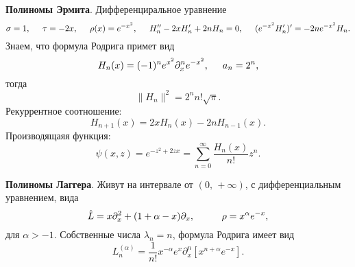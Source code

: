 \textbf{Полиномы Эрмита}. Дифференциральное уравнение
\begin{equation*}
    \sigma = 1, \hspace{5 mm} 
    \tau = - 2 x,
    \hspace{5 mm} \rho(x)  = e^{-x^2},
    \hspace{5 mm} 
    H_n'' - 2 x H_n' + 2 n H_n = 0, 
    \hspace{5 mm} 
    (e^{-x^2} H_n')' = -2 n e^{-x^2} H_n.
\end{equation*}
Знаем, что формула Родрига примет вид
\begin{equation*}
    H_n (x) = (-1)^n e^{x^2} \partial_x^n e^{-x^2},
    \hspace{5 mm} 
    a_n = 2^n,
\end{equation*}
тогда
\begin{equation*}
    \|H_n\|^2 =  2^n n! \sqrt{\pi}.
\end{equation*}
Рекуррентное соотношение:
\begin{equation*}
    H_{n+1} (x) = 2 x H_n (x) - 2 n H_{n-1} (x).
\end{equation*}
Производящаяя функция:
\begin{equation*}
    \psi(x,z) = e^{-z^2+2 zx} = \sum_{n=0}^{\infty}  \frac{H_n (x)}{n!} z^n.
\end{equation*}


\textbf{Полиномы Лаггера}. Живут на интервале от $(0,\, +\infty)$, с дифференциальным уравнением, вида
\begin{equation*}
    \hat{L} =  x \partial_x^2 + (1 +\alpha - x) \partial_x,
    \hspace{10 mm} 
    \rho = x^{\alpha} e^{-x},
\end{equation*}
для $\alpha > -1$. Собственные числа $\lambda_n = n$, формула Родрига имеет вид
\begin{equation*}
    L_n^{(\alpha)} = \frac{1}{n!} x^{-\alpha} e^x \partial_x^n \left[x^{n+\alpha} e^{-x}\right].
\end{equation*}
